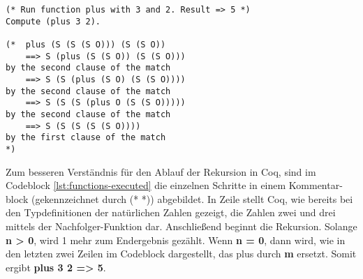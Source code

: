 \begin{lstlisting}[language=coq,firstnumber=1,caption=Coq rekursive Funktion,label=lst:functions-executed]
(* Run function plus with 3 and 2. Result => 5 *)
Compute (plus 3 2).

(*  plus (S (S (S O))) (S (S O))
	==> S (plus (S (S O)) (S (S O)))
by the second clause of the match
	==> S (S (plus (S O) (S (S O))))
by the second clause of the match
	==> S (S (S (plus O (S (S O)))))
by the second clause of the match
	==> S (S (S (S (S O))))
by the first clause of the match
*)
\end{lstlisting}
Zum besseren Verständnis für den Ablauf der Rekursion in Coq, sind im Codeblock \ref{lst:functions-executed} die einzelnen Schritte in einem Kommentar-block (gekennzeichnet durch (* *)) abgebildet. In Zeile stellt Coq, wie bereits bei den Typdefinitionen der natürlichen Zahlen gezeigt, die Zahlen zwei und drei mittels der Nachfolger-Funktion dar. Anschließend beginnt die Rekursion. Solange \textbf{n > 0}, wird 1 mehr zum Endergebnis gezählt. Wenn \textbf{n = 0}, dann wird, wie in den letzten zwei Zeilen im Codeblock dargestellt, das plus durch \textbf{m} ersetzt. Somit ergibt \textbf{plus 3 2 => 5}.

